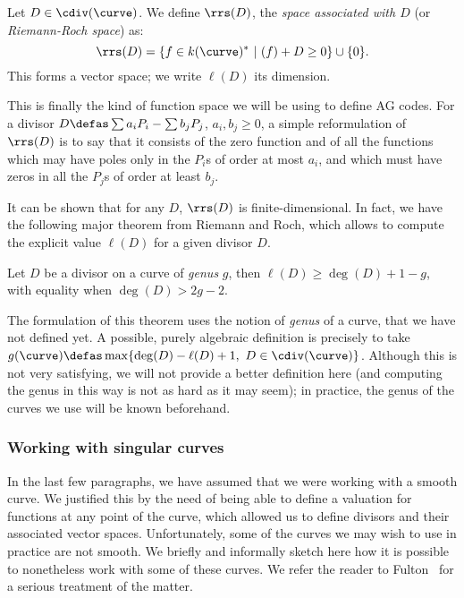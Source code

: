 \begin{defi}
Let $D \in \cdiv(\curve)$. We define $\rrs(D)$, the \emph{space associated with $D$} (or \emph{Riemann-Roch space}) as:
\[
\rrs(D) = \{f \in k(\curve)^*~|~(f) + D \geq 0\} \cup \{0\}.
\]
This forms a vector space; we write $\ell(D)$ its dimension.
\end{defi}

This is finally the kind of function space we will be using to define AG codes. For a divisor
$D \defas \sum a_iP_i - \sum b_jP_j$, $a_i, b_j \geq 0$, a simple reformulation of $\rrs(D)$ is to say that it consists of the zero function and of all the functions
which may have poles only in the $P_i$s of order at most $a_i$, and which must have zeros in all the $P_j$s of order
at least $b_j$.

It can be shown that for any $D$, $\rrs(D)$ is finite-dimensional. In fact, we have the following major theorem from Riemann and Roch, which allows to compute the explicit value $\ell(D)$
for a given divisor $D$.

\begin{thm}
Let $D$ be a divisor on a curve of \emph{genus} $g$, then $\ell(D) \geq \deg(D) + 1 - g$, with equality
when $\deg(D) > 2g - 2$.
\end{thm}

The formulation of this theorem uses the notion of \emph{genus} of a curve, that we have not defined yet. A possible, purely algebraic definition is precisely to take
$g(\curve) \defas \max \{\deg(D) - \ell(D) + 1,~D \in \cdiv(\curve)\}$. Although this is not very satisfying, we will not provide a better definition here (and computing
the genus in this way is not as hard as it may seem); in practice, the genus
of the curves we use will be known beforehand.

\subsubsection{Working with singular curves}
\label{sec:nonsingmod}

In the last few paragraphs, we have assumed that we were working with a smooth curve. We justified this by the need of being able to define a valuation for functions
at any point of the curve, which allowed us to define divisors and their associated vector spaces.
Unfortunately, some of the curves we may wish to use in practice are not smooth. We briefly and informally sketch here how it is possible to nonetheless work with some
of these curves. We refer the reader to \eg Fulton~\cite[Chap. 7]{fulton} for a serious treatment of the matter.

